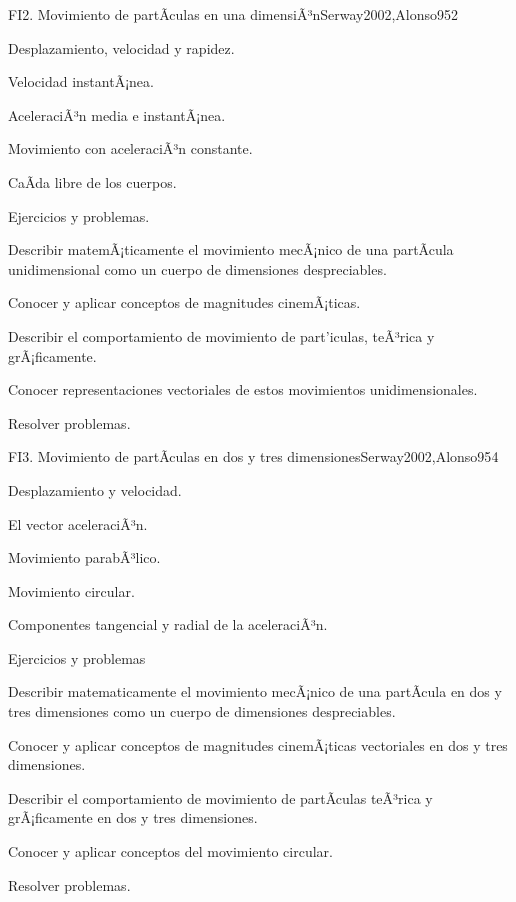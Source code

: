 \begin{syllabus}
\begin{unit}{FI2. Movimiento de partÃ­culas en una dimensiÃ³n}{Serway2002,Alonso95}{2}
\begin{topics}
      \item Desplazamiento, velocidad y rapidez.
      \item Velocidad instantÃ¡nea.
      \item AceleraciÃ³n media e instantÃ¡nea.
      \item Movimiento con aceleraciÃ³n constante.
      \item CaÃ­da libre de los cuerpos.
      \item Ejercicios y problemas.
    \end{topics}
   \begin{unitgoals}
      \item Describir matemÃ¡ticamente el movimiento mecÃ¡nico de una partÃ­cula unidimensional como un cuerpo de dimensiones despreciables.
      \item Conocer y aplicar conceptos de magnitudes cinemÃ¡ticas.
      \item Describir el comportamiento de movimiento de part'iculas, teÃ³rica y grÃ¡ficamente.
      \item Conocer representaciones vectoriales de estos movimientos unidimensionales.
      \item Resolver problemas.
   \end{unitgoals}
\end{unit}

\begin{unit}{FI3. Movimiento de partÃ­culas en dos y tres dimensiones}{Serway2002,Alonso95}{4}
\begin{topics}
      \item Desplazamiento y velocidad.
      \item El vector aceleraciÃ³n.
      \item Movimiento parabÃ³lico.
      \item Movimiento circular.
      \item Componentes tangencial y radial de la aceleraciÃ³n.
      \item Ejercicios y problemas
\end{topics}

   \begin{unitgoals}
      \item Describir matematicamente el movimiento mecÃ¡nico de una partÃ­cula en dos y tres dimensiones como un cuerpo de dimensiones despreciables.
      \item Conocer y aplicar conceptos de magnitudes cinemÃ¡ticas vectoriales en dos y tres dimensiones.
      \item Describir el comportamiento de movimiento de partÃ­culas teÃ³rica y grÃ¡ficamente en dos y tres dimensiones.
      \item Conocer y aplicar conceptos del movimiento circular.
      \item Resolver problemas.
   \end{unitgoals}
\end{unit}


\end{syllabus}
